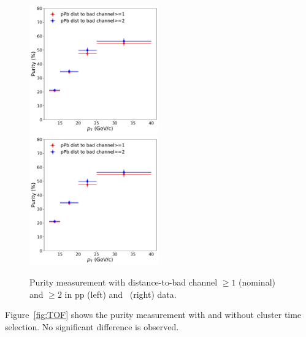 \begin{figure}
	\center
	\includegraphics[width=0.495\textwidth]{Checks_Systematics/ppbdistance.pdf}
	\includegraphics[width=0.495\textwidth]{Checks_Systematics/ppbdistance.pdf}
	\caption{Purity measurement with distance-to-bad channel $\geq 1$ (nominal) and $\geq 2$ in pp (left) and \pPb~(right) data.}
	\label{fig:distancetobadchannel}
\end{figure}

Figure~\ref{fig:TOF} shows the purity measurement with and without cluster time selection. No significant difference is observed. 

